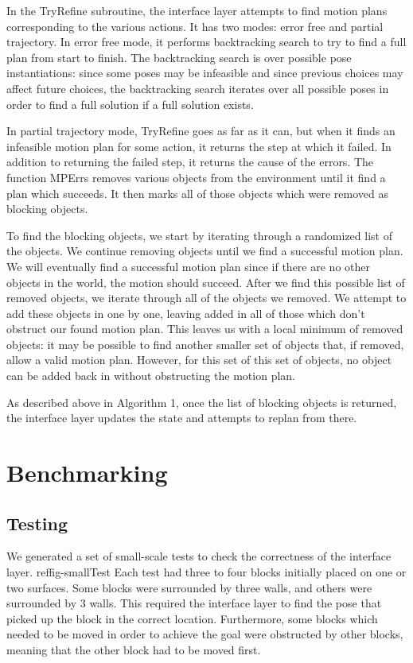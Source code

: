 \documentclass[12pt]{article}
\begin{document}
In the TryRefine subroutine, the interface layer attempts to find motion plans corresponding to the various actions.  
It has two modes: error free and partial trajectory.  
In error free mode, it performs backtracking search to try to find a full plan from start to finish.  
The backtracking search is over possible pose instantiations: since some poses may be infeasible and since previous choices may affect future choices, the backtracking search iterates over all possible poses in order to find a full solution if a full solution exists.  

In partial trajectory mode, TryRefine goes as far as it can, but when it finds an infeasible motion plan for some action, it returns the step at which it failed.  
In addition to returning the failed step, it returns the cause of the errors.  
The function MPErrs removes various objects from the environment until it find a plan which succeeds.  
It then marks all of those objects which were removed as blocking objects.

To find the blocking objects, we start by iterating through a randomized list of the objects.  We continue removing objects until we find a successful motion plan.  
We will eventually find a successful motion plan since if there are no other objects in the world, the motion should succeed.  
After we find this possible list of removed objects, we iterate through all of the objects we removed.  
We attempt to add these objects in one by one, leaving added in all of those which don't obstruct our found motion plan.  
This leaves us with a local minimum of removed objects: it may be possible to find another smaller set of objects that, if removed, allow a valid motion plan.  
However, for this set of this set of objects, no object can be added back in without obstructing the motion plan.

As described above in Algorithm 1, once the list of blocking objects is returned, the interface layer updates the state and attempts to replan from there.


\section{Benchmarking}

\subsection{Testing}
We generated a set of small-scale tests to check the correctness of the interface layer. ref{fig-smallTest} Each test had three to four blocks initially placed on one or two surfaces. Some blocks were surrounded by three walls, and others were surrounded by 3 walls. This required the interface layer to find the pose that picked up the block in the correct location. Furthermore, some blocks which needed to be moved in order to achieve the goal were obstructed by other blocks, meaning that the other block had to be moved first.
\end{document}
